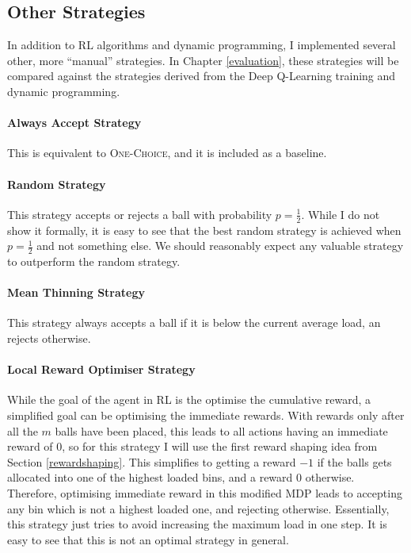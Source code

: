 \subsection{Other Strategies}

In addition to RL algorithms and dynamic programming, I implemented several other, more ``manual'' strategies. In Chapter \ref{evaluation}, these strategies will be compared against the strategies derived from the Deep Q-Learning training and dynamic programming.


\paragraph{Always Accept Strategy}
This is equivalent to \textsc{One-Choice}, and it is included as a baseline.


\paragraph{Random Strategy}
This strategy accepts or rejects a ball with probability $p=\frac{1}{2}$. While I do not show it formally, it is easy to see that the best random strategy is achieved when $p=\frac{1}{2}$ and not something else.  We should reasonably expect any valuable strategy to outperform the random strategy.


\paragraph{Mean Thinning Strategy}
This strategy always accepts a ball if it is below the current average load, an rejects otherwise.


\paragraph{Local Reward Optimiser Strategy}

While the goal of the agent in RL is the optimise the cumulative reward, a simplified goal can be optimising the immediate rewards. With rewards only after all the $m$ balls have been placed, this leads to all actions having an immediate reward of $0$, so for this strategy I will use the first reward shaping idea from Section \ref{rewardshaping}. This simplifies to getting a reward $-1$ if the balls gets allocated into one of the highest loaded bins, and a reward $0$ otherwise. Therefore, optimising immediate reward in this modified MDP leads to accepting any bin which is not a highest loaded one, and rejecting otherwise. Essentially, this strategy just tries to avoid increasing the maximum load in one step. It is easy to see that this is not an optimal strategy in general. 


